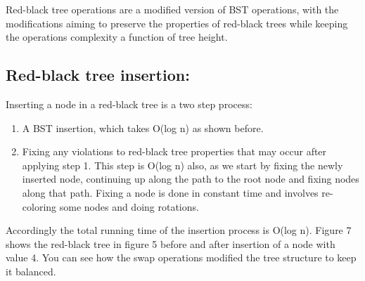 \documentclass[12pt]{article}
\begin{document}







Red-black tree operations are a modified version of BST operations, with the modifications aiming to preserve the properties of red-black trees while keeping the operations complexity a function of tree height.

\subsection*{Red-black tree insertion:}


Inserting a node in a red-black tree is a two step process:
\begin{enumerate}
	\item A BST insertion, which takes O(log n) as shown before.
	\item Fixing any violations to red-black tree properties that may occur after applying step 1. This step is O(log n) also, as we start by fixing the newly inserted node, continuing up along the path to the root node and fixing nodes along that path. Fixing a node is done in constant time and involves re-coloring some nodes and doing rotations.
\end{enumerate}
Accordingly the total running time of the insertion process is O(log n). Figure 7 shows the red-black tree in figure 5 before and after insertion of a node with value 4. You can see how the swap operations modified the tree structure to keep it balanced.
\end{document}
